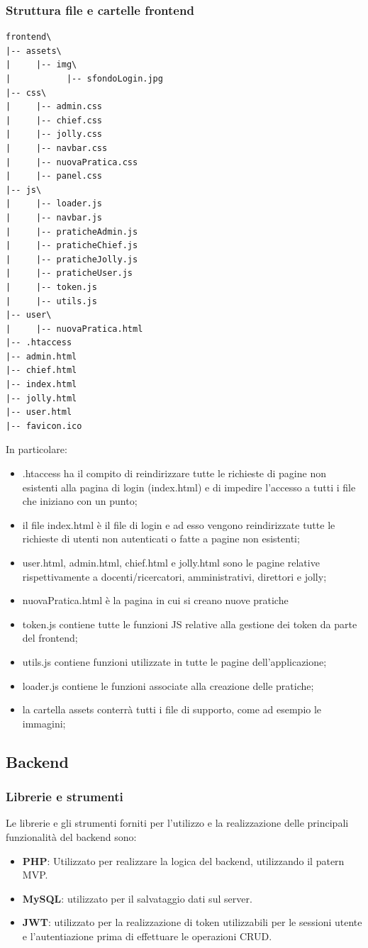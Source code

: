 \documentclass{article}
\begin{document}
\subsubsection{Struttura file e cartelle frontend}
\begin{verbatim}
frontend\
|-- assets\
|     |-- img\
|           |-- sfondoLogin.jpg
|-- css\
|     |-- admin.css
|     |-- chief.css
|     |-- jolly.css
|     |-- navbar.css
|     |-- nuovaPratica.css
|     |-- panel.css
|-- js\
|     |-- loader.js
|     |-- navbar.js
|     |-- praticheAdmin.js
|     |-- praticheChief.js
|     |-- praticheJolly.js
|     |-- praticheUser.js
|     |-- token.js
|     |-- utils.js
|-- user\
|     |-- nuovaPratica.html
|-- .htaccess
|-- admin.html
|-- chief.html
|-- index.html
|-- jolly.html
|-- user.html
|-- favicon.ico

\end{verbatim}
In particolare:
\begin{itemize}
    \item .htaccess ha il compito di reindirizzare tutte le richieste di pagine non esistenti alla pagina di login (index.html) e di impedire l'accesso a tutti i file che iniziano con un punto;
    \item il file index.html è il file di login e ad esso vengono reindirizzate tutte le richieste di utenti non autenticati o fatte a pagine non esistenti;
    \item user.html, admin.html, chief.html e jolly.html sono le pagine relative rispettivamente a docenti/ricercatori, amministrativi, direttori e jolly; 
    \item nuovaPratica.html è la pagina in cui si creano nuove pratiche
    \item token.js contiene tutte le funzioni JS relative alla gestione dei token da parte del frontend;
    \item utils.js contiene funzioni utilizzate in tutte le pagine dell'applicazione;
    \item loader.js contiene le funzioni associate alla creazione delle pratiche;
    \item la cartella assets conterrà tutti i file di supporto, come ad esempio le immagini;
\end{itemize}

\subsection{Backend}
\subsubsection{Librerie e strumenti}
Le librerie e gli strumenti forniti per l'utilizzo e la realizzazione delle principali funzionalità del backend sono:
\begin{itemize}
    \item \textbf{PHP}: Utilizzato per realizzare la logica del backend, utilizzando il patern MVP.
    \item \textbf{MySQL}: utilizzato per il salvataggio dati sul server.
    \item \textbf{JWT}: utilizzato per la realizzazione di token utilizzabili per le sessioni utente e l'autentiazione prima di effettuare le operazioni CRUD.
\end{itemize}
\end{document}
